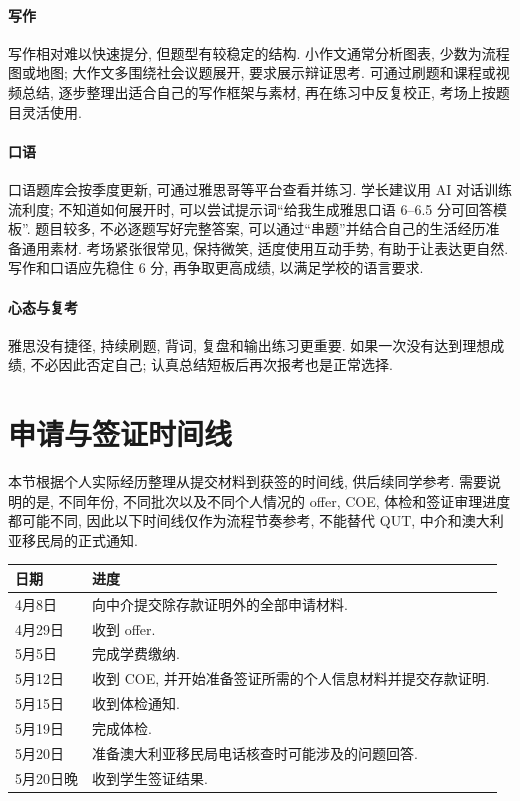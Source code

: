 \documentclass{jit-qut}
\begin{document}
\paragraph{写作} 写作相对难以快速提分, 但题型有较稳定的结构. 小作文通常分析图表, 少数为流程图或地图; 大作文多围绕社会议题展开, 要求展示辩证思考. 可通过刷题和课程或视频总结, 逐步整理出适合自己的写作框架与素材, 再在练习中反复校正, 考场上按题目灵活使用.

\paragraph{口语} 口语题库会按季度更新, 可通过雅思哥等平台查看并练习. 学长建议用 AI 对话训练流利度; 不知道如何展开时, 可以尝试提示词``给我生成雅思口语 6--6.5 分可回答模板''. 题目较多, 不必逐题写好完整答案, 可以通过``串题''并结合自己的生活经历准备通用素材. 考场紧张很常见, 保持微笑, 适度使用互动手势, 有助于让表达更自然. 写作和口语应先稳住 6 分, 再争取更高成绩, 以满足学校的语言要求.

\paragraph{心态与复考} 雅思没有捷径, 持续刷题, 背词, 复盘和输出练习更重要. 如果一次没有达到理想成绩, 不必因此否定自己; 认真总结短板后再次报考也是正常选择.

\clearpage
\section{申请与签证时间线}

本节根据个人实际经历整理从提交材料到获签的时间线, 供后续同学参考. 需要说明的是, 不同年份, 不同批次以及不同个人情况的 offer, COE, 体检和签证审理进度都可能不同, 因此以下时间线仅作为流程节奏参考, 不能替代 QUT, 中介和澳大利亚移民局的正式通知.

\scriptsize
\renewcommand{\arraystretch}{1.15}
\begin{longtable}{p{}p{}}
\toprule
日期 & 进度 \\
\midrule
\endhead
\bottomrule
\endfoot
4月8日 & 向中介提交除存款证明外的全部申请材料. \\
4月29日 & 收到 offer. \\
5月5日 & 完成学费缴纳. \\
5月12日 & 收到 COE, 并开始准备签证所需的个人信息材料并提交存款证明. \\
5月15日 & 收到体检通知. \\
5月19日 & 完成体检. \\
5月20日 & 准备澳大利亚移民局电话核查时可能涉及的问题回答. \\
5月20日晚 & 收到学生签证结果. \\
\end{longtable}
\normalsize
\end{document}
